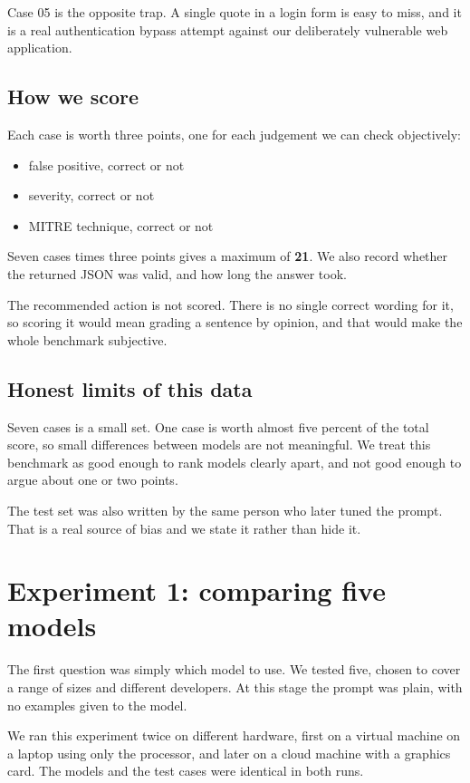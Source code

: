 \documentclass[11pt,a4paper]{article}
\begin{document}
Case 05 is the opposite trap. A single quote in a login form is easy to miss, and it
is a real authentication bypass attempt against our deliberately vulnerable web
application.

\subsection{How we score}

Each case is worth three points, one for each judgement we can check objectively:

\begin{itemize}[nosep]
  \item false positive, correct or not
  \item severity, correct or not
  \item MITRE technique, correct or not
\end{itemize}

Seven cases times three points gives a maximum of \textbf{21}. We also record
whether the returned JSON was valid, and how long the answer took.

The recommended action is not scored. There is no single correct wording for it, so
scoring it would mean grading a sentence by opinion, and that would make the whole
benchmark subjective.

\subsection{Honest limits of this data}

Seven cases is a small set. One case is worth almost five percent of the total
score, so small differences between models are not meaningful. We treat this
benchmark as good enough to rank models clearly apart, and not good enough to argue
about one or two points.

The test set was also written by the same person who later tuned the prompt. That is
a real source of bias and we state it rather than hide it.

\section{Experiment 1: comparing five models}

The first question was simply which model to use. We tested five, chosen to cover a
range of sizes and different developers. At this stage the prompt was plain, with no
examples given to the model.

We ran this experiment twice on different hardware, first on a virtual machine on a
laptop using only the processor, and later on a cloud machine with a graphics card.
The models and the test cases were identical in both runs.
\end{document}
